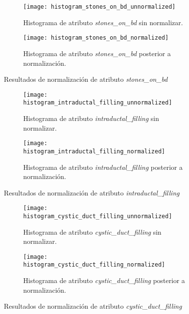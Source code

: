 \begin{figure}[!htb]
	\centering
	\begin{subfigure}[b]{0.4\textwidth}
		\centering
		\texttt{[image: histogram\_stones\_on\_bd\_unnormalized]}
		\caption{Histograma de atributo \emph{stones\_on\_bd} sin normalizar.}
	\end{subfigure}
	\hfill
	\begin{subfigure}[b]{0.4\textwidth}
		\centering
		\texttt{[image: histogram\_stones\_on\_bd\_normalized]}
		\caption{Histograma de atributo \emph{stones\_on\_bd} posterior a normalización.}
	\end{subfigure}
	\caption{Resultados de normalización de atributo \emph{stones\_on\_bd}}
	\label{Fig: stones_on_bd_NORM}
\end{figure}


\begin{figure}[!htb]
	\centering
	\begin{subfigure}[b]{0.4\textwidth}
		\centering
		\texttt{[image: histogram\_intraductal\_filling\_unnormalized]}
		\caption{Histograma de atributo \emph{intraductal\_filling} sin normalizar.}
	\end{subfigure}
	\hfill
	\begin{subfigure}[b]{0.4\textwidth}
		\centering
		\texttt{[image: histogram\_intraductal\_filling\_normalized]}
		\caption{Histograma de atributo \emph{intraductal\_filling} posterior a normalización.}
	\end{subfigure}
	\caption{Resultados de normalización de atributo \emph{intraductal\_filling}}
	\label{Fig: intraductal_filling_NORM}
\end{figure}


\begin{figure}[!htb]
	\centering
	\begin{subfigure}[b]{0.4\textwidth}
		\centering
		\texttt{[image: histogram\_cystic\_duct\_filling\_unnormalized]}
		\caption{Histograma de atributo \emph{cystic\_duct\_filling} sin normalizar.}
	\end{subfigure}
	\hfill
	\begin{subfigure}[b]{0.4\textwidth}
		\centering
		\texttt{[image: histogram\_cystic\_duct\_filling\_normalized]}
		\caption{Histograma de atributo \emph{cystic\_duct\_filling} posterior a normalización.}
	\end{subfigure}
	\caption{Resultados de normalización de atributo \emph{cystic\_duct\_filling}}
	\label{Fig: cystic_duct_filling_NORM}
\end{figure}



